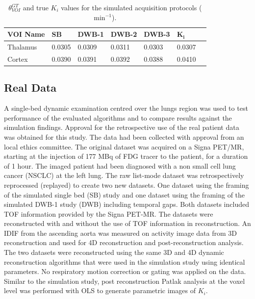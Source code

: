 \begin{table}[ht!]
\centering
\caption{\label{tab:GTvalues}$\theta_{VOI}^{GT}$ and true $K_i$ values for the simulated acquisition protocols ($\mathrm{min}^{-1}$).}
\begin{tabular}{lllllll}
\toprule
\textbf{VOI Name} & \textbf{SB} & \textbf{DWB-1} & \textbf{DWB-2} & \textbf{DWB-3} & {$\boldsymbol{K_i}$} \\
\midrule
Thalamus   & 0.0305 & 0.0309 & 0.0311 & 0.0303 & 0.0307\\
Cortex     & 0.0390 & 0.0391 & 0.0392 & 0.0388 & 0.0410\\
\toprule
\end{tabular}

\end{table}

\subsection{Real Data}
A single-bed dynamic examination centred over the lungs region was used to test performance of the evaluated algorithms and to compare results against the simulation findings. Approval for the retrospective use of the real patient data  was obtained for this study. The data had been collected with approval from an local ethics committee.
The original dataset was acquired on a Signa PET/MR, starting at the injection of 177 MBq of FDG tracer to the patient, for a duration of 1 hour. The imaged patient had been diagnosed with a non small cell lung cancer (NSCLC) at the left lung. 
The raw list-mode dataset was retrospectively reprocessed (replayed) to create two new datasets. One dataset using the framing of the simulated single bed (SB) study and one dataset using the framing of the simulated DWB-1 study (DWB) including temporal gaps.
Both datasets included TOF information provided by the Signa PET-MR. %
The datasets were reconstructed with and without the use of TOF information in reconstruction.
An IDIF from the ascending aorta was measured on activity image data from 3D reconstruction and used for 4D reconstruction and post-reconstruction analysis. The two datasets were reconstructed using the same 3D and 4D dynamic reconstruction algorithms that were used in the simulation study using identical parameters. No respiratory motion correction or gating was applied on the data.
Similar to the simulation study, post reconstruction Patlak analysis at the voxel level was performed with OLS to generate parametric images of $K_i$.
